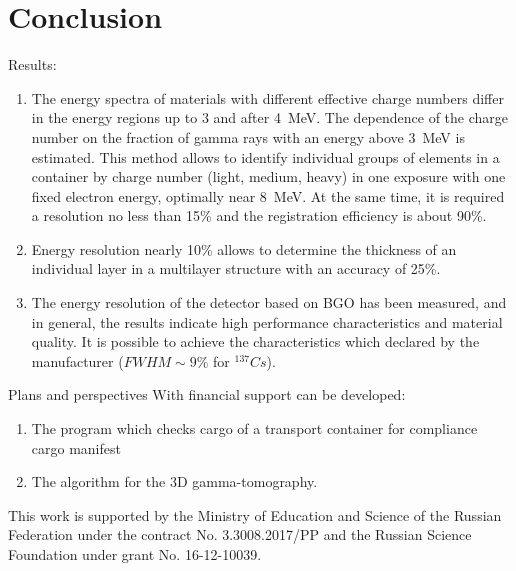 \documentclass[a4paper]{panl}
\begin{document}
\section*{Conclusion}
Results:   
    \begin{enumerate}
        \item The energy spectra of materials with different effective charge numbers differ in the energy regions up to 3 and after 4~MeV. The dependence of the charge number on the fraction of gamma rays with an energy above 3~MeV is estimated. This method allows to identify individual groups of elements in a container by charge number (light, medium, heavy) in one exposure with one fixed electron energy, optimally near 8~MeV. At the same time, it is required a resolution no less than 15\% and the registration efficiency is about 90\%.
        \item Energy resolution nearly 10\% allows to determine the thickness of an individual layer in a multilayer structure with an accuracy of 25\%.
        \item The energy resolution of the detector based on BGO has been measured, and in general, the results indicate high performance characteristics and material quality. It is possible to achieve the characteristics which declared by the manufacturer ($FWHM \sim 9\%$ for $^{137}Cs$).
    \end{enumerate}
Plans and perspectives
    With financial support can be developed:
    \begin{enumerate}
        \item The program which checks cargo of a transport container  for compliance cargo manifest
        \item The algorithm for the 3D gamma-tomography.
    \end{enumerate}

This work is supported by the Ministry of Education and Science of the Russian Federation under the contract No. 3.3008.2017/PP and the Russian Science Foundation under grant No. 16-12-10039.


\end{document}
